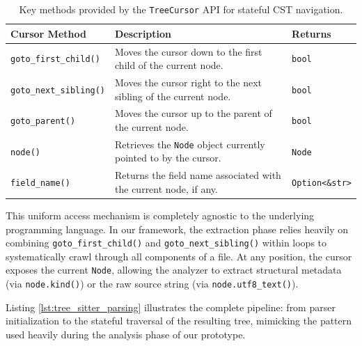 \begin{table}[ht]
  \footnotesize
  \centering
  \begin{tabularx}{\linewidth}{|l|X|l|}
    \hline
    \textbf{Cursor Method} & \textbf{Description} & \textbf{Returns} \\
    \hline
    \texttt{goto\_first\_child()} & Moves the cursor down to the
    first child of the current node. & \texttt{bool} \\
    \texttt{goto\_next\_sibling()} & Moves the cursor right to the
    next sibling of the current node. & \texttt{bool} \\
    \texttt{goto\_parent()} & Moves the cursor up to the parent of
    the current node. & \texttt{bool} \\
    \texttt{node()} & Retrieves the \texttt{Node} object currently
    pointed to by the cursor. & \texttt{Node} \\
    \texttt{field\_name()} & Returns the field name associated with
    the current node, if any. & \texttt{Option<\&str>} \\
    \hline
  \end{tabularx}
  \caption{Key methods provided by the \texttt{TreeCursor} API for
  stateful CST navigation.}
  \label{tab:treecursor_methods}
\end{table}

This uniform access mechanism is completely agnostic to the underlying
programming language. In our framework, the extraction phase relies
heavily on combining \texttt{goto\_first\_child()} and
\texttt{goto\_next\_sibling()} within loops to systematically crawl
through all components of a file. At any position, the cursor exposes
the current \texttt{Node}, allowing the analyzer to extract structural
metadata (via \texttt{node.kind()}) or the raw source string (via
\texttt{node.utf8\_text()}).

Listing \ref{lst:tree_sitter_parsing} illustrates the complete pipeline:
from parser initialization to the stateful traversal of the resulting
tree, mimicking the pattern used heavily during the analysis phase of
our prototype.


